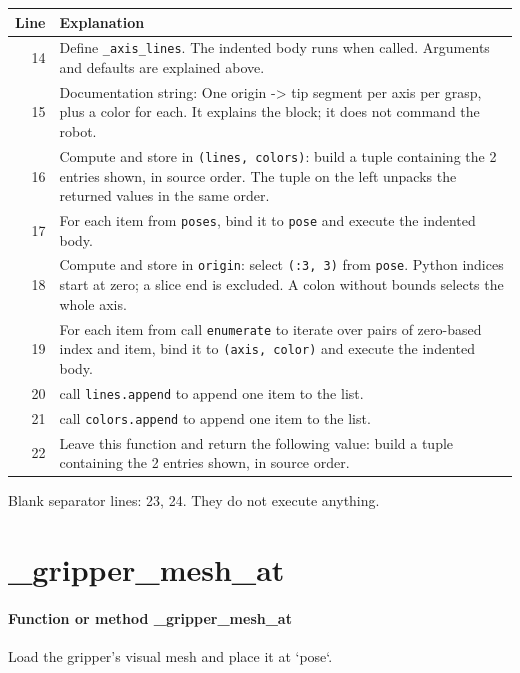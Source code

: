 \documentclass[11pt,a4paper]{book}
\begin{document}
\begin{longtable}{r p{}}

\textbf{Line} & \textbf{Explanation} \\ \hline \endhead

14 & Define \texttt{\_axis\_lines}. The indented body runs when called. Arguments and defaults are explained above. \\

15 & Documentation string: One origin -> tip segment per axis per grasp, plus a color for each. It explains the block; it does not command the robot. \\

16 & Compute and store in \texttt{(lines, colors)}: build a tuple containing the 2 entries shown, in source order. The tuple on the left unpacks the returned values in the same order. \\

17 & For each item from \texttt{poses}, bind it to \texttt{pose} and execute the indented body. \\

18 & Compute and store in \texttt{origin}: select \texttt{(:3, 3)} from \texttt{pose}. Python indices start at zero; a slice end is excluded. A colon without bounds selects the whole axis.  \\

19 & For each item from call \texttt{enumerate} to iterate over pairs of zero-based index and item, bind it to \texttt{(axis, color)} and execute the indented body. \\

20 & call \texttt{lines.append} to append one item to the list. \\

21 & call \texttt{colors.append} to append one item to the list. \\

22 & Leave this function and return the following value: build a tuple containing the 2 entries shown, in source order. \\

\end{longtable}

Blank separator lines: 23, 24. They do not execute anything.

\section{\_gripper\_mesh\_at}

\paragraph{Function or method \_gripper\_mesh\_at}
Load the gripper's visual mesh and place it at `pose`.
\end{document}
